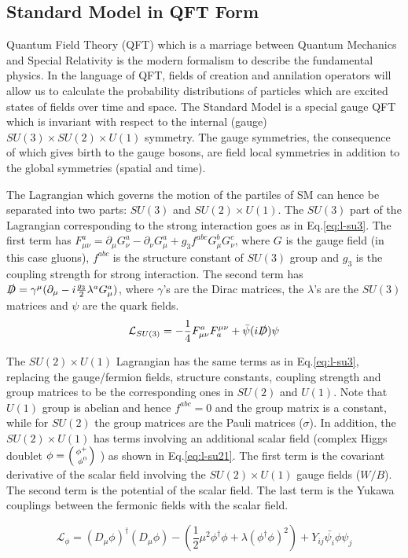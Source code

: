 \subsection{Standard Model in QFT Form}

Quantum Field Theory (QFT) which is a marriage between Quantum Mechanics and Special Relativity is the modern formalism to describe the fundamental physics. In the language of QFT, fields of creation and annilation operators will allow us to calculate the probability distributions of particles which are excited states of fields over time and space. The Standard Model is a special gauge QFT which is invariant with respect to the internal (gauge) $SU(3)\times SU(2)\times U(1)$ symmetry. The gauge symmetries, the consequence of which gives birth to the gauge bosons, are field local symmetries in addition to the global symmetries (spatial and time). 

The Lagrangian which governs the motion of the partiles of SM can hence be separated into two parts: $SU(3)$ and $SU(2)\times U(1)$. The $SU(3)$ part of the Lagrangian corresponding to the strong interaction goes as in Eq.\ref{eq:l-su3}. The first term has $F^{a}_{\mu\nu}  = \partial_{\mu}G^a_{\nu}-\partial_{\nu}G^a_{\mu}+g_3f^{abc}G^b_{\mu}G^c_{\nu}$, where $G$ is the gauge field (in this case gluons), $f^{abc}$ is the structure constant of $SU(3)$ group and $g_3$ is the coupling strength for strong interaction. The second term has $\slashed{D} = \gamma^{\mu}(\partial_{\mu}- i\frac{g_3}{2}\lambda^aG^a_{\mu})$, where $\gamma$'s are the Dirac matrices, the $\lambda$'s are the $SU(3)$ matrices and $\psi$ are the quark fields. 
\begin{equation}
  \mathcal{L}_{SU(3)} = -\frac{1}{4}F^{a}_{\mu\nu}F_{a}^{\mu\nu}+ \bar{\psi}(i\slashed{D}) \psi
  \label{eq:l-su3}
\end{equation}

The $SU(2)\times U(1)$ Lagrangian has the same terms as in Eq.\ref{eq:l-su3}, replacing the gauge/fermion fields, structure constants, coupling strength and group matrices to be the corresponding ones in $SU(2)$ and $U(1)$. Note that $U(1)$ group is abelian and hence $f^{abc}=0$ and the group matrix is a constant, while for $SU(2)$ the group matrices are the Pauli matrices ($\sigma$). In addition, the $SU(2)\times U(1)$ has terms involving an additional scalar field (complex Higgs doublet $\phi = \begin{psmallmatrix*}[r] \phi^+ \\ \phi^0 \end{psmallmatrix*} $ ) as shown in Eq.\ref{eq:l-su21}. The first term is the covariant derivative of the scalar field involving the $SU(2)\times U(1)$ gauge fields ($W/B$). The second term is the potential of the scalar field. The last term is the Yukawa couplings between the fermonic fields with the scalar field. 

\begin{equation}
  \mathcal{L}_{\phi} = (D_{\mu}\phi)^{\dagger}(D_{\mu}\phi)-(\frac{1}{2}\mu^2\phi^{\dagger}\phi+\lambda(\phi^{\dagger}\phi )^2)+Y_{ij}\bar{\psi_i}\phi\psi_j
  \label{eq:l-su21}
\end{equation}

